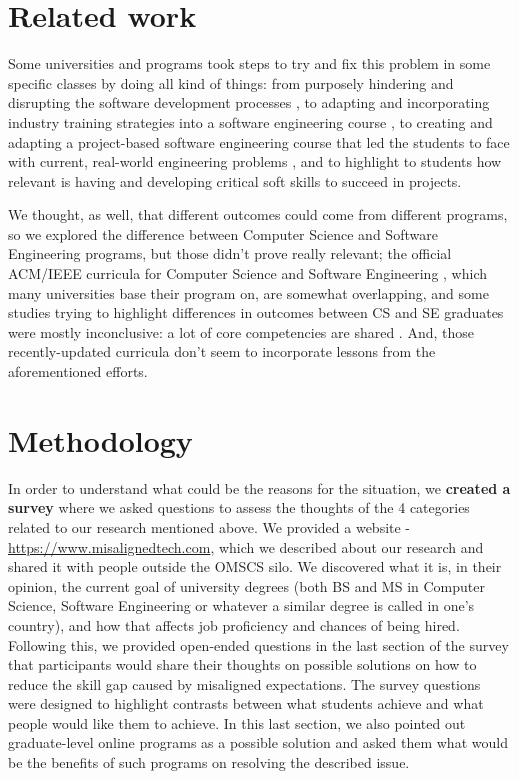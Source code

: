 \documentclass{sigchi}
\begin{document}
\section{Related work}
Some universities and programs took steps to try and fix this problem in some specific classes by doing all kind of things: from purposely hindering and disrupting the software development processes \cite{Dawson2000}, to adapting and incorporating industry training strategies into a software engineering course \cite{Portela2017}, to creating and adapting a project-based software engineering course that led the students to face with current, real-world engineering problems \cite{Delgado2017}, and to highlight to students how relevant is having and developing critical soft skills to succeed in projects\cite{Bastarrica2017}.

We thought, as well, that different outcomes could come from different programs, so we explored the difference between Computer Science and Software Engineering programs, but those didn't prove really relevant; the official ACM/IEEE curricula for Computer Science \cite{Force2013} and Software Engineering \cite{Ardis2015}, which many universities base their program on, are somewhat overlapping, and some studies trying to highlight differences in outcomes between CS and SE graduates were mostly inconclusive: a lot of core competencies are shared \cite{Meziane2004} \cite{Rasool2014}. And, those recently-updated curricula don't seem to incorporate lessons from the aforementioned efforts.

\section{Methodology}
In order to understand what could be the reasons for the situation, we \textbf{created a survey} where we asked questions to assess the thoughts of the 4 categories related to our research mentioned above. We provided a website - \url{https://www.misalignedtech.com}, which we described about our research and shared it with people outside the OMSCS silo. We discovered what it is, in their opinion, the current goal of university degrees (both BS and MS in Computer Science, Software Engineering or whatever a similar degree is called in one's country), and how that affects job proficiency and chances of being hired. Following this, we provided open-ended questions in the last section of the survey that participants would share their thoughts on possible solutions on how to reduce the skill gap caused by misaligned expectations. The survey questions were designed to highlight contrasts between what students achieve and what people would like them to achieve. In this last section, we also pointed out graduate-level online programs as a possible solution and asked them what would be the benefits of such programs on resolving the described issue.
\end{document}
